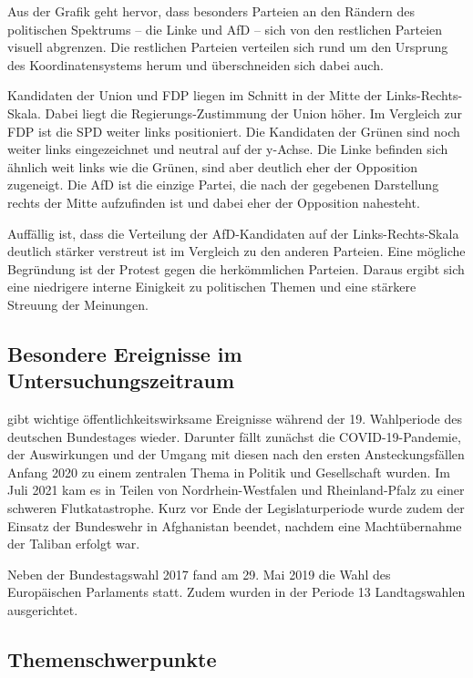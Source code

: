 Aus der Grafik geht hervor, dass besonders Parteien an den Rändern des politischen Spektrums -- die Linke und \ac{AfD} -- sich von den restlichen Parteien visuell abgrenzen. Die restlichen Parteien verteilen sich rund um den Ursprung des Koordinatensystems herum und überschneiden sich dabei auch.

Kandidaten der Union und \ac{FDP} liegen im Schnitt in der Mitte der Links-Rechts-Skala. Dabei liegt die Regierungs-Zustimmung der Union höher. Im Vergleich zur \ac{FDP} ist die \ac{SPD} weiter links positioniert. Die Kandidaten der Grünen sind noch weiter links eingezeichnet und neutral auf der y-Achse. Die Linke befinden sich ähnlich weit links wie die Grünen, sind aber deutlich eher der Opposition zugeneigt. Die \ac{AfD} ist die einzige Partei, die nach der gegebenen Darstellung rechts der Mitte aufzufinden ist und dabei eher der Opposition nahesteht.

Auffällig ist, dass die Verteilung der \ac{AfD}-Kandidaten auf der Links-Rechts-Skala deutlich stärker verstreut ist im Vergleich zu den anderen Parteien. Eine mögliche Begründung ist der Protest gegen die herkömmlichen Parteien. Daraus ergibt sich eine niedrigere interne Einigkeit zu politischen Themen und eine stärkere Streuung der Meinungen.

\subsection{Besondere Ereignisse im Untersuchungszeitraum} \label{subsec:besondereEreignisse}

\textcite{schmid_deutscher_2021} gibt wichtige öffentlichkeitswirksame Ereignisse während der \num{19}. Wahlperiode des deutschen Bundestages wieder. Darunter fällt zunächst die \ac{COVID-19}-Pandemie, der Auswirkungen und der Umgang mit diesen nach den ersten Ansteckungsfällen Anfang 2020 zu einem zentralen Thema in Politik und Gesellschaft wurden. Im Juli 2021 kam es in Teilen von Nordrhein-Westfalen und Rheinland-Pfalz zu einer schweren Flutkatastrophe. Kurz vor Ende der Legislaturperiode wurde zudem der Einsatz der Bundeswehr in Afghanistan beendet, nachdem eine Machtübernahme der Taliban erfolgt war.

Neben der Bundestagswahl \num{2017} fand am 29. Mai 2019 die Wahl des Europäischen Parlaments statt. Zudem wurden in der Periode \num{13} Landtagswahlen ausgerichtet.

\subsection{Themenschwerpunkte} \label{subsec:themenschwerpunkte}

